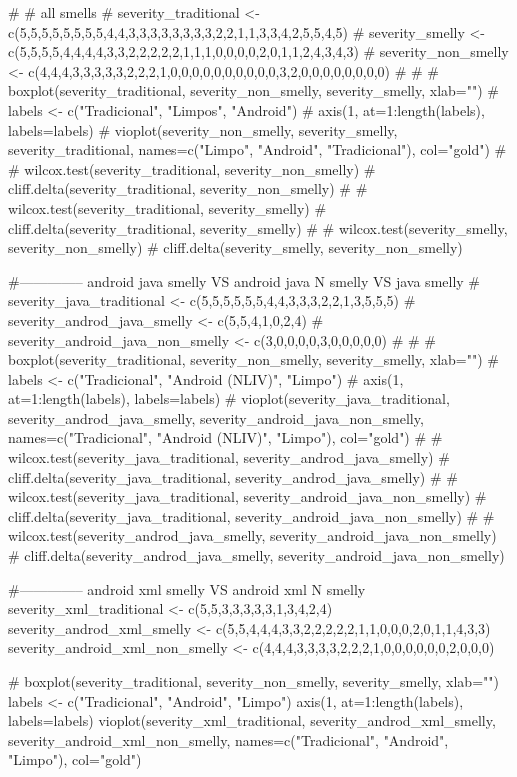 # # all smells
# severity_traditional <-  c(5,5,5,5,5,5,5,5,4,4,3,3,3,3,3,3,3,3,2,2,1,1,3,3,4,2,5,5,4,5)
# severity_smelly      <- c(5,5,5,5,4,4,4,4,3,3,2,2,2,2,2,1,1,1,0,0,0,0,2,0,1,1,2,4,3,4,3)
# severity_non_smelly <-  c(4,4,4,3,3,3,3,3,2,2,2,1,0,0,0,0,0,0,0,0,0,0,3,2,0,0,0,0,0,0,0,0)
# 
# # boxplot(severity_traditional, severity_non_smelly, severity_smelly, xlab="")
# labels <- c("Tradicional", "Limpos", "Android")
# axis(1, at=1:length(labels), labels=labels)
# vioplot(severity_non_smelly, severity_smelly, severity_traditional, names=c("Limpo", "Android", "Tradicional"), col="gold")
# 
# wilcox.test(severity_traditional, severity_non_smelly)
# cliff.delta(severity_traditional, severity_non_smelly)
# 
# wilcox.test(severity_traditional, severity_smelly)
# cliff.delta(severity_traditional, severity_smelly)
# 
# wilcox.test(severity_smelly, severity_non_smelly)
# cliff.delta(severity_smelly, severity_non_smelly)


#-------------- android java smelly VS android java N smelly VS java smelly
# severity_java_traditional <-  c(5,5,5,5,5,5,4,4,3,3,3,2,2,1,3,5,5,5)
# severity_androd_java_smelly <- c(5,5,4,1,0,2,4)
# severity_android_java_non_smelly <-  c(3,0,0,0,0,3,0,0,0,0,0)
# 
# # boxplot(severity_traditional, severity_non_smelly, severity_smelly, xlab="")
# labels <- c("Tradicional", "Android (NLIV)", "Limpo")
# axis(1, at=1:length(labels), labels=labels)
# vioplot(severity_java_traditional, severity_androd_java_smelly, severity_android_java_non_smelly, names=c("Tradicional", "Android (NLIV)", "Limpo"), col="gold")
# 
# wilcox.test(severity_java_traditional, severity_androd_java_smelly)
# cliff.delta(severity_java_traditional, severity_androd_java_smelly)
# 
# wilcox.test(severity_java_traditional, severity_android_java_non_smelly)
# cliff.delta(severity_java_traditional, severity_android_java_non_smelly)
# 
# wilcox.test(severity_androd_java_smelly, severity_android_java_non_smelly)
# cliff.delta(severity_androd_java_smelly, severity_android_java_non_smelly)


#-------------- android xml smelly VS android xml N smelly
severity_xml_traditional <- c(5,5,3,3,3,3,3,1,3,4,2,4)
severity_androd_xml_smelly <- c(5,5,4,4,4,3,3,2,2,2,2,2,1,1,0,0,0,2,0,1,1,4,3,3)
severity_android_xml_non_smelly <- c(4,4,4,3,3,3,3,2,2,2,1,0,0,0,0,0,0,2,0,0,0)

# boxplot(severity_traditional, severity_non_smelly, severity_smelly, xlab="")
labels <- c("Tradicional", "Android", "Limpo")
axis(1, at=1:length(labels), labels=labels)
vioplot(severity_xml_traditional, severity_androd_xml_smelly, severity_android_xml_non_smelly, names=c("Tradicional", "Android", "Limpo"), col="gold")

